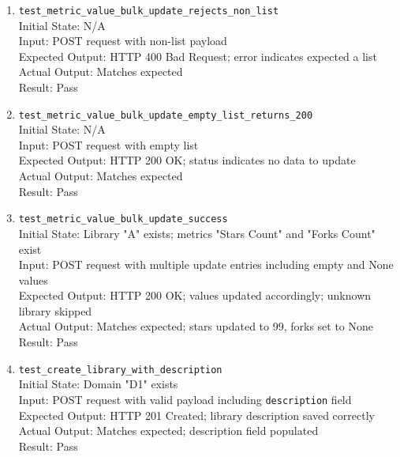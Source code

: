 \documentclass[12pt, titlepage]{article}
\begin{document}
\begin{enumerate}
      \\Result: Pass
    \item \texttt{test\_metric\_value\_bulk\_update\_rejects\_non\_list} \label{test-metric-value-bulk-update-rejects-non-list}
      \\Initial State: N/A
      \\Input: POST request with non-list payload
      \\Expected Output: HTTP 400 Bad Request; error indicates expected a list
      \\Actual Output: Matches expected
      \\Result: Pass
    \item \texttt{test\_metric\_value\_bulk\_update\_empty\_list\_returns\_200} \label{test-metric-value-bulk-update-empty-list-returns-200}
      \\Initial State: N/A
      \\Input: POST request with empty list
      \\Expected Output: HTTP 200 OK; status indicates no data to update
      \\Actual Output: Matches expected
      \\Result: Pass
    \item \texttt{test\_metric\_value\_bulk\_update\_success} \label{test-metric-value-bulk-update-success}
      \\Initial State: Library "A" exists; metrics "Stars Count" and "Forks Count" exist
      \\Input: POST request with multiple update entries including empty and None values
      \\Expected Output: HTTP 200 OK; values updated accordingly; unknown library skipped
      \\Actual Output: Matches expected; stars updated to 99, forks set to None
      \\Result: Pass
    \item \texttt{test\_create\_library\_with\_description} \label{test-create-library-with-description}
      \\Initial State: Domain "D1" exists
      \\Input: POST request with valid payload including \texttt{description} field
      \\Expected Output: HTTP 201 Created; library description saved correctly
      \\Actual Output: Matches expected; description field populated
      \\Result: Pass


\end{enumerate}
\end{document}
